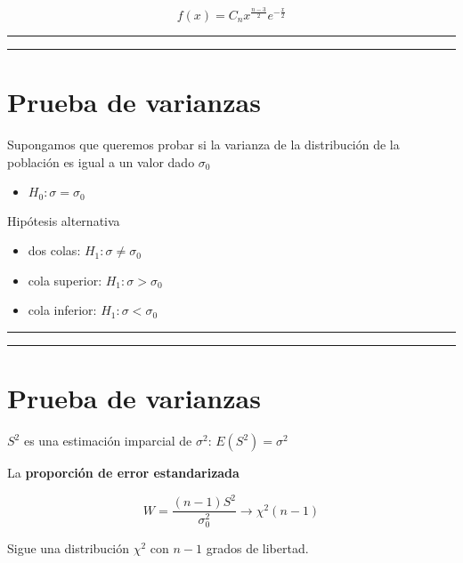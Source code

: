 \documentclass[
]{book}
\providecommand{\tightlist}{%
  \setlength{\itemsep}{0pt}\setlength{\parskip}{0pt}}
\begin{document}
\[f(x)=C_n x^{\frac{n-3}{2}} e^{-\frac{x}{2}}\]

\begin{center}\rule{0.5\linewidth}{0.5pt}\end{center}

\begin{center}\rule{0.5\linewidth}{0.5pt}\end{center}

\hypertarget{prueba-de-varianzas-2}{%
\section{Prueba de varianzas}\label{prueba-de-varianzas-2}}

Supongamos que queremos probar si la varianza de la distribución de la población es igual a un valor dado \(\sigma_0\)

\begin{itemize}
\tightlist
\item
  \(H_0:\sigma=\sigma_0\)
\end{itemize}

Hipótesis alternativa

\begin{itemize}
\item
  dos colas: \(H_1:\sigma \neq \sigma_0\)
\item
  cola superior: \(H_1:\sigma > \sigma_0\)
\item
  cola inferior: \(H_1:\sigma < \sigma_0\)
\end{itemize}

\begin{center}\rule{0.5\linewidth}{0.5pt}\end{center}

\begin{center}\rule{0.5\linewidth}{0.5pt}\end{center}

\hypertarget{prueba-de-varianzas-3}{%
\section{Prueba de varianzas}\label{prueba-de-varianzas-3}}

\(S^2\) es una estimación imparcial de \(\sigma^2\): \(E(S^2)=\sigma^2\)

La \textbf{proporción de error estandarizada}

\[W=\frac{(n-1)S^2}{\sigma_0^2} \rightarrow \chi^2(n-1)\]

Sigue una distribución \(\chi^2\) con \(n-1\) grados de libertad.
\end{document}
